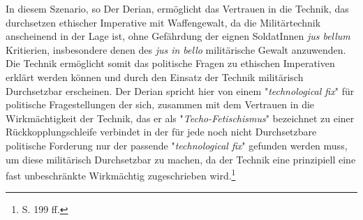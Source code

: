 \documentclass[11pt,a4paper,oneside,numbers=noenddot,bibliography=totocnumbered,DIV=13]{scrartcl}
\begin{document}
In diesem Szenario, so Der Derian, ermöglicht das Vertrauen in die Technik, das durchsetzen ethischer Imperative mit Waffengewalt, da die Militärtechnik anscheinend in der Lage ist, ohne Gefährdung der eignen SoldatInnen \textit{jus bellum} Kritierien, insbesondere denen des \textit{jus in bello} militärische Gewalt anzuwenden. Die Technik ermöglicht somit das politische Fragen zu ethischen Imperativen erklärt werden können und durch den Einsatz der Technik militärisch Durchsetzbar erscheinen. Der Derian spricht hier von einem "\textit{technological fix}" für politische Fragestellungen der sich, zusammen mit dem Vertrauen in die Wirkmächtigkeit der Technik, das er als "\textit{Techo-Fetischismus}" bezeichnet zu einer Rückkopplungschleife verbindet in der für jede noch nicht Durchsetzbare politische Forderung nur der passende "\textit{technological fix}" gefunden werden muss, um diese militärisch Durchsetzbar zu machen, da der Technik eine prinzipiell eine fast unbeschränkte Wirkmächtig zugeschrieben wird.\footnote{\cite{DerDerian2001}S. 199 ff.} 
\end{document}

